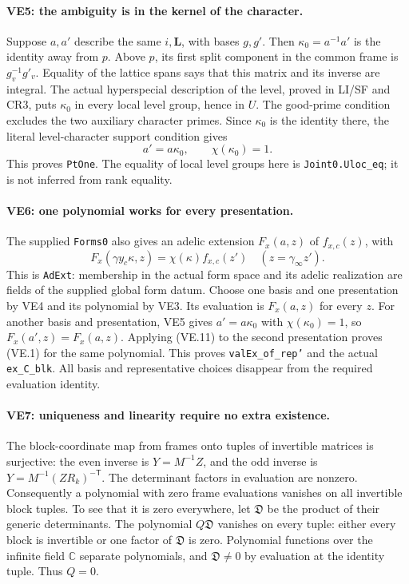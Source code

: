 \documentclass[11pt,a4paper]{article}
\numberwithin{equation}{section}
\theoremstyle{remark}\newtheorem{remark}[theorem]{Remark}
\begin{document}
\paragraph{VE5: the ambiguity is in the kernel of the character.}
Suppose $a,a'$ describe the same $i,\mathbf L$, with bases $g,g'$.
Then $\kappa_0=a^{-1}a'$ is the identity away from $p$. Above $p$,
its first split component in the common frame is $g_v^{-1}g'_v$.
Equality of the lattice spans says that this matrix and its inverse
are integral. The actual hyperspecial description of the level,
proved in LI/SF and CR3, puts $\kappa_0$ in every local level group,
hence in $U$. The good-prime condition excludes the two auxiliary
character primes. Since $\kappa_0$ is the identity there, the
literal level-character support condition gives
\[
 a'=a\kappa_0,\qquad \chi(\kappa_0)=1.
                                                        \tag{VE.10}
\]
This proves \texttt{PtOne}. The equality of local level groups here
is \texttt{Joint0.Uloc\_\allowbreak eq}; it is not inferred from rank equality.

\paragraph{VE6: one polynomial works for every presentation.}
The supplied \texttt{Forms0} also gives an adelic extension
$F_x(a,z)$ of $f_{x,c}(z)$, with
\[
 F_x(\gamma y_c\kappa,z)
       =\chi(\kappa)f_{x,c}(z')\quad(z=\gamma_\infty z').
                                                        \tag{VE.11}
\]
This is \texttt{AdExt}: membership in the actual form space and its
adelic realization are fields of the supplied global form datum.
Choose one basis and one presentation by VE4 and its polynomial
by VE3. Its evaluation is $F_x(a,z)$ for every $z$.
For another basis and presentation, VE5 gives $a'=a\kappa_0$ with
$\chi(\kappa_0)=1$, so $F_x(a',z)=F_x(a,z)$. Applying (VE.11)
to the second presentation proves (VE.1) for the same polynomial.
This proves \texttt{valEx\_\allowbreak of\_\allowbreak rep'} and the actual
\texttt{ex\_\allowbreak C\_\allowbreak blk}. All basis and representative choices disappear
from the required evaluation identity.

\paragraph{VE7: uniqueness and linearity require no extra existence.}
The block-coordinate map from frames onto tuples of invertible
matrices is surjective: the even inverse is $Y=M^{-1}Z$, and the
odd inverse is
$Y=M^{-1}(ZR_k)^{-\mathsf T}$.
The determinant factors in evaluation are nonzero. Consequently a
polynomial with zero frame evaluations vanishes on all invertible
block tuples. To see that it is zero everywhere, let $\mathfrak D$
be the product of their generic determinants. The polynomial
$Q\mathfrak D$ vanishes on every tuple: either every block is
invertible or one factor of $\mathfrak D$ is zero. Polynomial
functions over the infinite field $\mathbb C$ separate polynomials,
and $\mathfrak D\ne0$ by evaluation at the identity tuple.
Thus $Q=0$.
\end{document}
